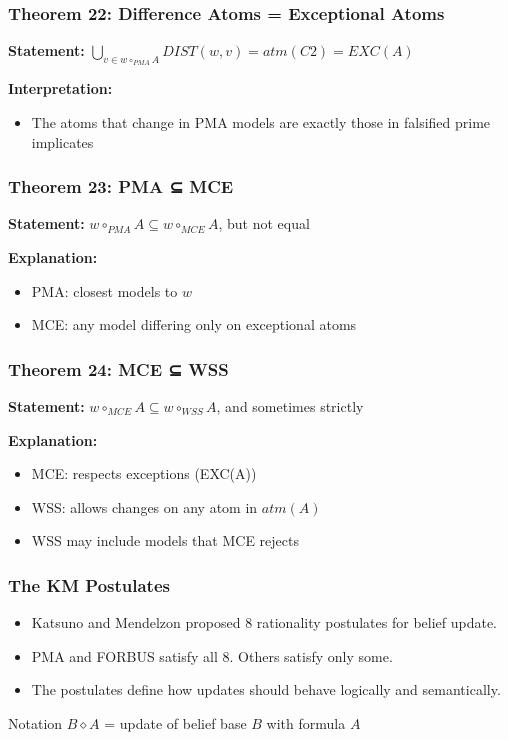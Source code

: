 \documentclass{beamer}
\begin{document}
\begin{frame}
\frametitle{Theorem 22: Difference Atoms = Exceptional Atoms}
\textbf{Statement:} $\bigcup_{v \in w \circ_{PMA} A} DIST(w, v) = atm(C2) = EXC(A)$

\textbf{Interpretation:}
\begin{itemize}
\item The atoms that change in PMA models are exactly those in falsified prime implicates
\end{itemize}
\end{frame}

\begin{frame}
\frametitle{Theorem 23: PMA ⊆ MCE}
\textbf{Statement:} $w \circ_{PMA} A \subseteq w \circ_{MCE} A$, but not equal

\textbf{Explanation:}
\begin{itemize}
\item PMA: closest models to $w$
\item MCE: any model differing only on exceptional atoms
\end{itemize}
\end{frame}

\begin{frame}
\frametitle{Theorem 24: MCE ⊆ WSS}
\textbf{Statement:} $w \circ_{MCE} A \subseteq w \circ_{WSS} A$, and sometimes strictly

\textbf{Explanation:}
\begin{itemize}
\item MCE: respects exceptions (EXC(A))
\item WSS: allows changes on any atom in $atm(A)$
\item WSS may include models that MCE rejects
\end{itemize}
\end{frame}


\begin{frame}
\frametitle{The KM Postulates}
\begin{itemize}
    \item Katsuno and Mendelzon proposed 8 rationality postulates for belief update.
    \item PMA and FORBUS satisfy all 8. Others satisfy only some.
    \item The postulates define how updates should behave logically and semantically.
\end{itemize}
\pause
\begin{block}{Notation}
$B \diamond A$ = update of belief base $B$ with formula $A$
\end{block}
\end{frame}
\end{document}
